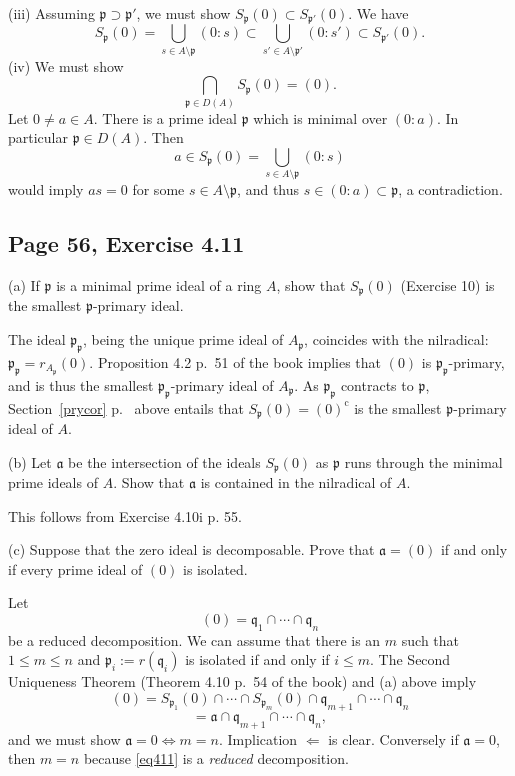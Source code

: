 \documentclass[parskip=half,fontsize=12pt]{scrartcl}%
\newcommand{\oo}{\operatorname}\newcommand{\ooo}{\operatorname*}
\newcommand{\mf}{\mathfrak}
\newcommand{\aaa}{\mf a}
\newcommand{\ppp}{\mf p}
\newcommand{\qqq}{\mf q}
\begin{document}
(iii) Assuming $\ppp\supset\ppp'$, we must show $S_\ppp(0)\subset S_{\ppp'}(0)$. We have 
$$
S_\ppp(0)=\bigcup_{s\in A\setminus\ppp}(0:s)\subset\bigcup_{s'\in A\setminus\ppp'}(0:s')\subset S_{\ppp'}(0).
$$
(iv) We must show 
$$
\bigcap_{\ppp\in D(A)}S_\ppp(0)=(0).
$$ 
Let $0\ne a\in A$. There is a prime ideal $\ppp$ which is minimal over $(0:a)$. In particular $\ppp\in D(A)$. Then 
$$
a\in S_\ppp(0)=\bigcup_{s\in A\setminus\ppp}(0:s)
$$ 
would imply $as=0$ for some $s\in A\setminus\ppp$, and thus $s\in(0:a)\subset\ppp$, a contradiction.

\subsection{Page 56, Exercise 4.11}\label{411}%

(a) If $\ppp$ is a minimal prime ideal of a ring $A$, show that $S_\ppp(0)$ (Exercise 10) is the smallest $\ppp$-primary ideal.

The ideal $\ppp_\ppp$, being the unique prime ideal of $A_\ppp$, coincides with the nilradical: $\ppp_\ppp=r_{A_\ppp}(0)$. Proposition 4.2 p.~51 of the book implies that $(0)$ is $\ppp_\ppp$-primary, and is thus the smallest $\ppp_\ppp$-primary ideal of $A_\ppp$. As $\ppp_\ppp$ contracts to $\ppp$, Section~\ref{prycor} p.~\pageref{prycor} above entails that $S_\ppp(0)=(0)^{\oo c}$ is the smallest $\ppp$-primary ideal of $A$. %

(b) Let $\aaa$ be the intersection of the ideals $S_\ppp(0)$ as  $\ppp$ runs through the minimal prime ideals of $A$. Show that $\aaa$ is contained in the nilradical of $A$.

This follows from Exercise 4.10i p. 55.

(c) Suppose that the zero ideal is decomposable. Prove that $\aaa=(0)$ if and only if every prime ideal of $(0)$ is isolated.

Let 
$$
(0)=\qqq_1\cap\cdots\cap\qqq_n
$$ 
be a reduced decomposition. We can assume that there is an $m$ such that $1\le m\le n$ and $\ppp_i:=r(\qqq_i)$ is isolated if and only if $i\le m$. The Second Uniqueness Theorem (Theorem 4.10 p.~54 of the book) and (a) above imply 
\begin{equation}\label{eq411}
(0)=S_{\ppp_1}(0)\cap\cdots\cap S_{\ppp_m}(0)\cap\qqq_{m+1}\cap\cdots\cap\qqq_n
\end{equation} 
$$
=\aaa\cap\qqq_{m+1}\cap\cdots\cap\qqq_n,
$$ 
and we must show $\aaa=0\iff m=n$. Implication $\Longleftarrow$ is clear. Conversely if $\aaa=0$, then $m=n$ because \eqref{eq411} is a \emph{reduced} decomposition.
\end{document}
